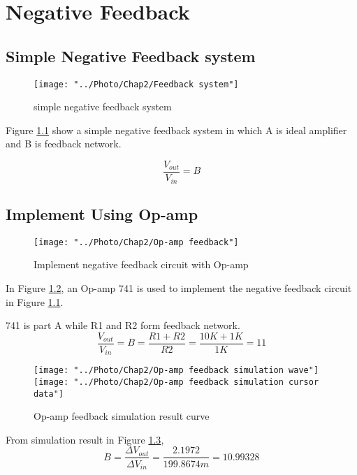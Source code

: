 \chapter{Negative Feedback}
\section{Simple Negative Feedback system}

\begin{figure}[htbp]
	\centering
	\texttt{[image: "../Photo/Chap2/Feedback system"]}
	\caption{simple negative feedback system}
	\label{fig:Feedback system}
\end{figure}

Figure \ref{fig:Feedback system} show a simple negative feedback system in which A is ideal amplifier and B is feedback network. 

\[  \frac{V_{out}}{V_{in}} = B  \] 

\section{Implement Using Op-amp}


\begin{figure}[htbp]
	\centering
	\texttt{[image: "../Photo/Chap2/Op-amp feedback"]}
	\caption{Implement negative feedback circuit with Op-amp}
	\label{fig:Op-amp feedback}
\end{figure}


In Figure \ref{fig:Op-amp feedback}, an Op-amp 741 is used to implement the negative feedback circuit in Figure \ref{fig:Feedback system}.

741 is part A while R1 and R2 form feedback network. 
\[ \frac{V_{out}}{V_{in}} = B = \frac{R1 + R2}{R2} = \frac{10K + 1K}{1K} = 11 \]
 
\begin{figure}[htbp]
	\centering 
	\texttt{[image: "../Photo/Chap2/Op-amp feedback simulation wave"]}\\[0.5cm]
	\texttt{[image: "../Photo/Chap2/Op-amp feedback simulation cursor data"]}
	\caption{Op-amp  feedback simulation result curve}
	\label{fig:Op-amp  feedback simulation result }
\end{figure}

From simulation result in Figure \ref{fig:Op-amp  feedback simulation result }, 
\[ B = \frac{\Delta V_{out}}{\Delta V_{in}} =  \frac{2.1972}{199.8674m} =  10.99328 \]
 
